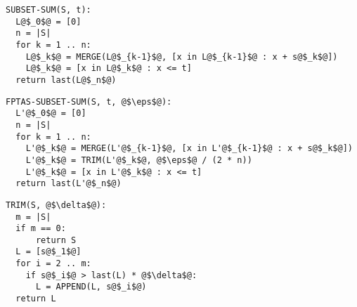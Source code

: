 \begin{verbatim}
SUBSET-SUM(S, t):
  L@$_0$@ = [0]
  n = |S|
  for k = 1 .. n:
    L@$_k$@ = MERGE(L@$_{k-1}$@, [x in L@$_{k-1}$@ : x + s@$_k$@])
    L@$_k$@ = [x in L@$_k$@ : x <= t]
  return last(L@$_n$@)
\end{verbatim}



\begin{verbatim}
FPTAS-SUBSET-SUM(S, t, @$\eps$@):
  L'@$_0$@ = [0]
  n = |S|
  for k = 1 .. n:
    L'@$_k$@ = MERGE(L'@$_{k-1}$@, [x in L'@$_{k-1}$@ : x + s@$_k$@])
    L'@$_k$@ = TRIM(L'@$_k$@, @$\eps$@ / (2 * n))
    L'@$_k$@ = [x in L'@$_k$@ : x <= t]
  return last(L'@$_n$@)
\end{verbatim}

\begin{verbatim}
TRIM(S, @$\delta$@):
  m = |S|
  if m == 0:
      return S
  L = [s@$_1$@]
  for i = 2 .. m:
    if s@$_i$@ > last(L) * @$\delta$@:
      L = APPEND(L, s@$_i$@)
  return L
\end{verbatim}

